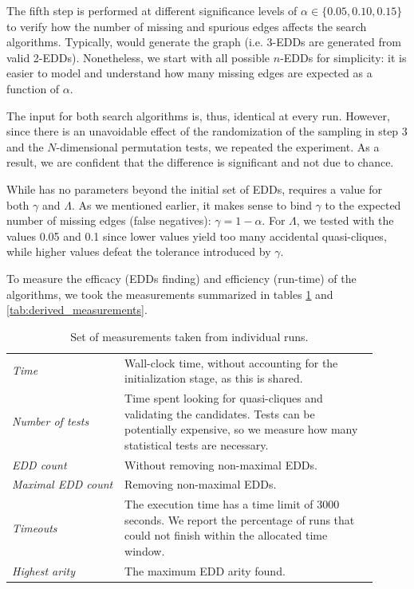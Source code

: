 The fifth step is performed at different significance levels of
$\alpha \in \{0.05, 0.10, 0.15\}$
to verify how the number of missing and spurious edges affects the search algorithms.
Typically, \Mind would generate the graph (i.e. 3-EDDs are generated from valid 2-EDDs).
Nonetheless, we start with all possible $n$-EDDs for simplicity: it is easier to
model and understand how many missing edges are expected as a function of $\alpha$.

The input for both search algorithms is, thus, identical at every run. However, since
there is an unavoidable effect of the randomization of the sampling in step 3 and the
$N$-dimensional permutation tests, we repeated the experiment.
As a result, we are confident that the difference is significant and not due to chance.

While \Find has no parameters beyond the initial set of \glspl{EDD},
\PresQ requires a value for both $\gamma$ and $\Lambda$. As we mentioned earlier,
it makes sense to bind $\gamma$ to the expected number of missing edges
(false negatives): $\gamma = 1 - \alpha$. For $\Lambda$, we tested with the
values 0.05 and 0.1 since lower values yield too many accidental quasi-cliques,
while higher values defeat the tolerance introduced by $\gamma$.

To measure the efficacy (\glspl{EDD} finding) and efficiency (run-time) of the algorithms,
we took the measurements summarized in tables \ref{tab:raw_measurements}
and \ref{tab:derived_measurements}.

\begin{table}[tbp]
    \caption{Set of measurements taken from individual runs.}
    \label{tab:raw_measurements}
    \centering
    \begin{tabular}{p{0.28\linewidth} p{0.63\linewidth}}
        \emph{Time}  & Wall-clock time, without accounting for the initialization stage,
                       as this is shared. \\
        \emph{Number of tests} & Time spent looking for quasi-cliques and validating the
                                   candidates.
                                   Tests can be potentially expensive, so we measure how many
                                   statistical tests are necessary. \\
        \emph{EDD count} & Without removing non-maximal \glspl{EDD}. \\
        \emph{Maximal EDD count} & Removing non-maximal \glspl{EDD}. \\
        \emph{Timeouts} & The execution time has a time limit of 3000 seconds. We report the
         percentage of runs that could not finish within the allocated time window. \\
        \emph{Highest arity} & The maximum \gls{EDD} arity found. \\
    \end{tabular}
\end{table}


